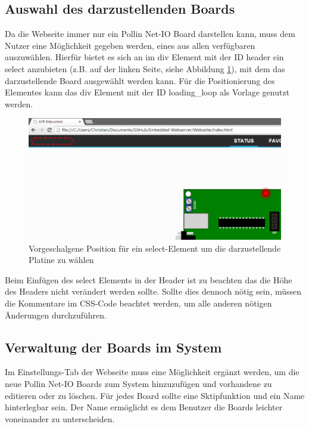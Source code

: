 \subsection{Auswahl des darzustellenden Boards}
\label{auswahl_board}
Da die Webseite immer nur ein Pollin Net-IO Board darstellen kann, muss dem
Nutzer eine Möglichkeit gegeben werden, eines aus allen verfügbaren auszuwählen.
Hierfür bietet es sich an im \textrm{div} Element mit der ID \textrm{header}
ein \textrm{select} anzubieten (z.B. auf der linken Seite, siehe
Abbildung \ref{select_board}), mit dem das darzustellende Board ausgewählt
werden kann.
Für die Positionierung des Elementes kann das \textrm{div} Element mit der ID \textrm{loading_loop} als
Vorlage genutzt werden.

\begin{figure}[H]
\centering
\includegraphics[width=13cm]{content/pictures/select_board.png}
\caption{Vorgeschalgene Position für ein select-Element um die darzustellende
Platine zu wählen}
\label{select_board}
\end{figure}

Beim Einfügen des \textrm{select} Elements in der Header ist zu beachten das die
Höhe des Headers nicht verändert werden sollte. Sollte dies dennoch nötig sein,
müssen die Kommentare im CSS-Code beachtet werden, um alle anderen nötigen
Änderungen durchzuführen.

\subsection{Verwaltung der Boards im System}
\label{verwaltung_system}
Im Einstellungs-Tab der Webseite muss eine Möglichkeit ergänzt werden, um die
neue Pollin Net-IO Boards zum System hinzuzufügen und vorhandene zu editieren
oder zu löschen. Für jedes Board sollte eine Sktipfunktion und ein Name
hinterlegbar sein. Der Name ermöglicht es dem Benutzer die Boards leichter
voneinander zu unterscheiden.

